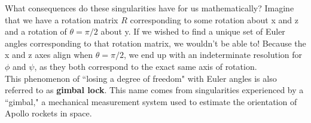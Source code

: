 \documentclass[oneside]{book}
\begin{document}
What consequences do these singularities have for us mathematically? Imagine that we have a rotation matrix $R$ corresponding to some rotation about x and z and a rotation of $\theta = \pi/2$ about y. If we wished to find a unique set of Euler angles corresponding to that rotation matrix, we wouldn't be able to! Because the x and z axes align when $\theta = \pi/2$, we end up with an indeterminate resolution for $\phi$ and $\psi$, as they both correspond to the exact same axis of rotation.\\
This phenomenon of ``losing a degree of freedom" with Euler angles is also referred to as \textbf{gimbal lock}. This name comes from singularities experienced by a ``gimbal," a mechanical measurement system used to estimate the orientation of Apollo rockets in space.
\end{document}

